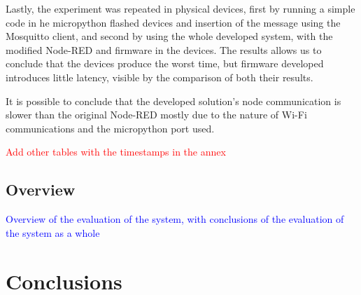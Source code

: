 Lastly, the experiment was repeated in physical devices, first by running a simple code in he micropython flashed devices and insertion of the message using the Mosquitto client, and second by using the whole developed system, with the modified Node-RED and firmware in the devices. The results allows us to conclude that the devices produce the worst time, but firmware developed introduces little latency, visible by the comparison of both their results.

It is possible to conclude that the developed solution's node communication is slower than the original Node-RED mostly due to the nature of Wi-Fi communications and the micropython port used.   

\textcolor{red}{Add other tables with the timestamps in the annex}

\subsection{Overview}\label{sec:discussion_overview}

\textcolor{blue}{Overview of the evaluation of the system, with conclusions of the evaluation of the system as a whole}

\section{Conclusions}\label{sec:evaluation_conclusions}

